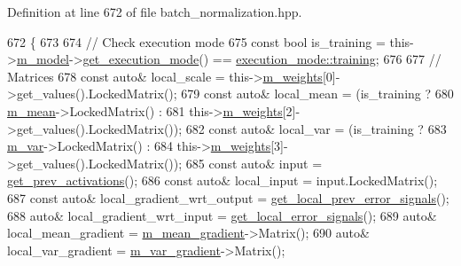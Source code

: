 Definition at line 672 of file batch\+\_\+normalization.\+hpp.


\begin{DoxyCode}
672                         \{
673 
674     \textcolor{comment}{// Check execution mode}
675     \textcolor{keyword}{const} \textcolor{keywordtype}{bool} is\_training = this->\hyperlink{classlbann_1_1Layer_a3d9315e99574166f2f33e37b572021d2}{m\_model}->\hyperlink{classlbann_1_1model_addb40597cf29aa6d31b6a7d09ef48608}{get\_execution\_mode}() == 
      \hyperlink{base_8hpp_a2781a159088df64ed7d47cc91c4dc0a8ac185ddac8b5a8f5aa23c5b80bc12d214}{execution\_mode::training};
676 
677     \textcolor{comment}{// Matrices}
678     \textcolor{keyword}{const} \textcolor{keyword}{auto}& local\_scale = this->\hyperlink{classlbann_1_1Layer_a7954e30fbf9100a6ba4b56d02767a469}{m\_weights}[0]->get\_values().LockedMatrix();
679     \textcolor{keyword}{const} \textcolor{keyword}{auto}& local\_mean = (is\_training ?
680                               \hyperlink{classlbann_1_1batch__normalization_a7c0db2315a4c5bb662da7a740ae76e24}{m\_mean}->LockedMatrix() :
681                               this->\hyperlink{classlbann_1_1Layer_a7954e30fbf9100a6ba4b56d02767a469}{m\_weights}[2]->get\_values().LockedMatrix());
682     \textcolor{keyword}{const} \textcolor{keyword}{auto}& local\_var = (is\_training ?
683                              \hyperlink{classlbann_1_1batch__normalization_aba533149e4179378ab23443b0a2a7dc6}{m\_var}->LockedMatrix() :
684                              this->\hyperlink{classlbann_1_1Layer_a7954e30fbf9100a6ba4b56d02767a469}{m\_weights}[3]->get\_values().LockedMatrix());
685     \textcolor{keyword}{const} \textcolor{keyword}{auto}& input = \hyperlink{classlbann_1_1Layer_a45853df73a2e72bfaa774665a0f37ed7}{get\_prev\_activations}();
686     \textcolor{keyword}{const} \textcolor{keyword}{auto}& local\_input = input.LockedMatrix();
687     \textcolor{keyword}{const} \textcolor{keyword}{auto}& local\_gradient\_wrt\_output = \hyperlink{classlbann_1_1Layer_a82827edc5e869960144f3ccb2172bfcd}{get\_local\_prev\_error\_signals}();
688     \textcolor{keyword}{auto}& local\_gradient\_wrt\_input = \hyperlink{classlbann_1_1Layer_af178d00b9d878aa7d87754bff2a91f3a}{get\_local\_error\_signals}();
689     \textcolor{keyword}{auto}& local\_mean\_gradient = \hyperlink{classlbann_1_1batch__normalization_aa4677c2f7d5ea27c53bf0f61f280a2a3}{m\_mean\_gradient}->Matrix();
690     \textcolor{keyword}{auto}& local\_var\_gradient = \hyperlink{classlbann_1_1batch__normalization_aa2d2050a265eed854aa8950cd1461af9}{m\_var\_gradient}->Matrix();

\end{DoxyCode}
